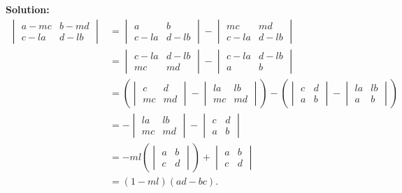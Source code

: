 \documentclass[11pt]{article}
\newcommand\solution{\vspace{.10in}\textbf{Solution: }}
\begin{document}
\solution \begin{align*}
\begin{vmatrix}
  a-mc&b-md\\
  c-la&d-lb
\end{vmatrix}&=
\begin{vmatrix}
  a&b\\
 c-la&d-lb
\end{vmatrix}-
\begin{vmatrix}
  mc&md\\
  c-la&d-lb
\end{vmatrix}\\&=
\begin{vmatrix}
  c-la&d-lb\\
  mc&md
\end{vmatrix}-
\begin{vmatrix}
  c-la&d-lb\\
 a&b
\end{vmatrix}\\&=\left(
                 \begin{vmatrix}
                   c&d\\
mc&md
                 \end{vmatrix}-
    \begin{vmatrix}
      la&lb\\
mc&md
    \end{vmatrix}
\right)-\left(
    \begin{vmatrix}
      c&d\\
     a&b
    \end{vmatrix}-
        \begin{vmatrix}
          la&lb\\
           a&b
        \end{vmatrix}
\right)
\\&=-
    \begin{vmatrix}
      la&lb\\
      mc&md
    \end{vmatrix}-
          \begin{vmatrix}
            c&d\\
           a&b
          \end{vmatrix}
\\&=-ml\left(
    \begin{vmatrix}
      a&b\\
     c&d
    \end{vmatrix}\right)+
        \begin{vmatrix}
          a&b\\
c&d
        \end{vmatrix}
\\&=(1-ml)(ad-bc).
\end{align*}
\end{document}

